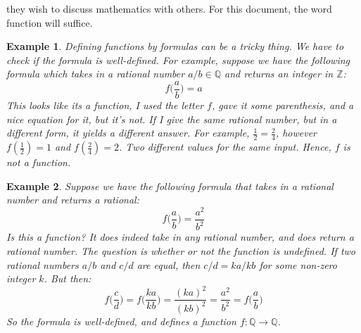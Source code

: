 \documentclass{article}
\theoremstyle{plain}
\theoremstyle{normal}
\newtheorem{example}{Example}[section]
\begin{document}
        they wish to discuss mathematics with others. For this document, the
        word function will suffice.
        \begin{example}
            Defining functions by formulas can be a tricky thing. We have to
            check if the formula is \textit{well-defined}. For example, suppose
            we have the following formula which takes in a rational number
            $a/b\in\mathbb{Q}$ and returns an integer in $\mathbb{Z}$:
            \begin{equation}
                f\big(\frac{a}{b}\big)=a
            \end{equation}
            This looks like its a function, I used the letter $f$, gave it
            some parenthesis, and a nice equation for it, but it's not.
            If I give the same rational number, but in a different form, it
            yields a different answer. For example,
            $\frac{1}{2}=\frac{2}{4}$, however $f(\frac{1}{2})=1$ and
            $f(\frac{2}{4})=2$. Two different values for the same input.
            Hence, $f$ is not a function.
        \end{example}
        \begin{example}
            Suppose we have the following formula that takes in a rational
            number and returns a rational:
            \begin{equation}
                f\big(\frac{a}{b}\big)=\frac{a^{2}}{b^{2}}
            \end{equation}
            Is this a function? It does indeed take in any rational number,
            and does return a rational number. The question is whether or not
            the function is undefined. If two rational numbers $a/b$ and
            $c/d$ are equal, then $c/d = ka/kb$ for some non-zero integer $k$.
            But then:
            \begin{equation}
                f\big(\frac{c}{d}\big)=f\big(\frac{ka}{kb}\big)
                    =\frac{(ka)^{2}}{(kb)^{2}}
                    =\frac{a^{2}}{b^{2}}
                    =f\big(\frac{a}{b}\big)
            \end{equation}
            So the formula is well-defined, and defines a function
            $f:\mathbb{Q}\rightarrow\mathbb{Q}$.
        \end{example}
\end{document}
